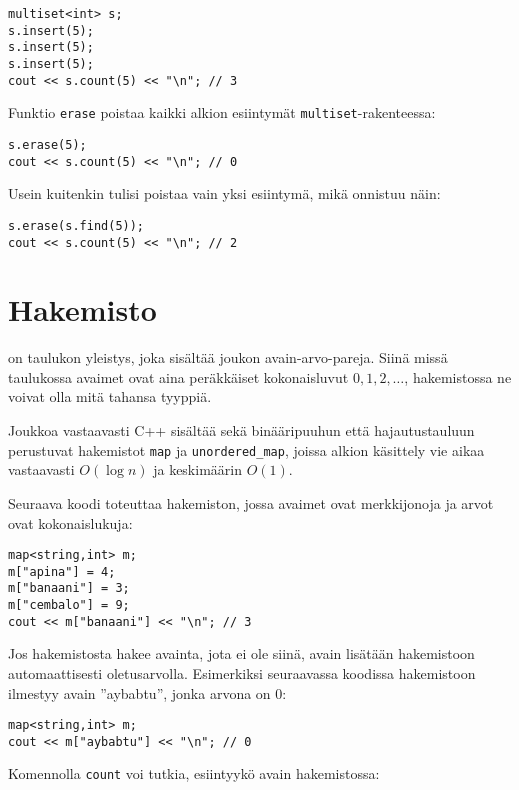 \begin{lstlisting}
multiset<int> s;
s.insert(5);
s.insert(5);
s.insert(5);
cout << s.count(5) << "\n"; // 3
\end{lstlisting}

Funktio \texttt{erase} poistaa
kaikki alkion esiintymät
\texttt{multiset}-rakenteessa:

\begin{lstlisting}
s.erase(5);
cout << s.count(5) << "\n"; // 0
\end{lstlisting}

Usein kuitenkin tulisi poistaa
vain yksi esiintymä,
mikä onnistuu näin:

\begin{lstlisting}
s.erase(s.find(5));
cout << s.count(5) << "\n"; // 2
\end{lstlisting}

\section{Hakemisto}


 on taulukon yleistys,
joka sisältää joukon avain-arvo-pareja.
Siinä missä taulukossa avaimet ovat aina peräkkäiset
kokonaisluvut $0,1,2,\ldots$,
hakemistossa ne voivat
olla mitä tahansa tyyppiä.

Joukkoa vastaavasti C++ sisältää sekä
binääripuuhun että hajautustauluun perustuvat
hakemistot \texttt{map} ja \texttt{unordered\_map},
joissa alkion käsittely vie aikaa vastaavasti
$O(\log n)$ ja keskimäärin $O(1)$.

Seuraava koodi toteuttaa hakemiston,
jossa avaimet ovat merkkijonoja ja
arvot ovat kokonaislukuja:

\begin{lstlisting}
map<string,int> m;
m["apina"] = 4;
m["banaani"] = 3;
m["cembalo"] = 9;
cout << m["banaani"] << "\n"; // 3
\end{lstlisting}

Jos hakemistosta hakee avainta,
jota ei ole siinä,
avain lisätään hakemistoon
automaattisesti oletusarvolla.
Esimerkiksi seuraavassa koodissa
hakemistoon ilmestyy avain ''aybabtu'',
jonka arvona on 0:

\begin{lstlisting}
map<string,int> m;
cout << m["aybabtu"] << "\n"; // 0
\end{lstlisting}

Komennolla \texttt{count} voi
tutkia, esiintyykö avain hakemistossa:

